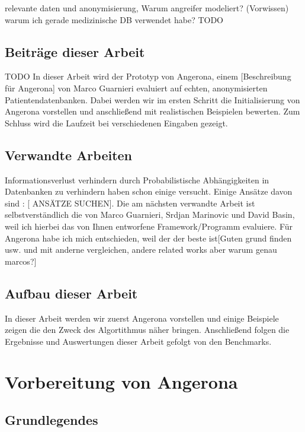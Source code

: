 \documentclass[german,version-2020-11]{uzl-thesis}
\begin{document}
relevante daten und anonymisierung, Warum angreifer modeliert? (Vorwissen) 
warum ich gerade medizinische DB verwendet habe?
TODO

\section{Beiträge dieser Arbeit}
TODO
In dieser Arbeit wird der Prototyp von Angerona, einem [Beschreibung für Angerona] von Marco Guarnieri evaluiert auf echten, anonymisierten Patientendatenbanken. Dabei werden wir im ersten Schritt  die Initialisierung von Angerona vorstellen und anschließend mit realistischen Beispielen bewerten. Zum Schluss wird die Laufzeit bei verschiedenen Eingaben gezeigt.


\section{Verwandte Arbeiten}
Informationsverlust verhindern durch Probabilistische Abhängigkeiten in Datenbanken zu verhindern haben schon einige versucht. Einige Ansätze davon sind : [ ANSÄTZE SUCHEN]. Die am nächsten verwandte Arbeit ist selbstverständlich die von Marco Guarnieri, Srdjan Marinovic und David Basin, weil ich hierbei das von Ihnen entworfene Framework/Programm evaluiere. Für Angerona habe ich mich entschieden, weil der der beste ist[Guten grund finden usw. und mit anderne vergleichen, andere related works aber warum genau marcos?]


\section{Aufbau dieser Arbeit}
In dieser Arbeit werden wir zuerst Angerona vorstellen und einige Beispiele zeigen die den Zweck des Algortithmus näher bringen. Anschließend folgen die Ergebnisse und Auswertungen dieser Arbeit gefolgt von den Benchmarks.
\chapter{Vorbereitung von Angerona}
\section{Grundlegendes}
\end{document}
